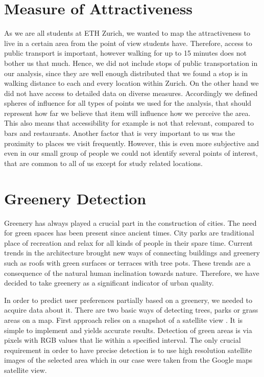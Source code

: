 \documentclass[letterpaper]{article}
\begin{document}
\section{Measure of Attractiveness}\label{sec:attractiveness}
As we are all students at ETH Zurich, we wanted to map the attractiveness to live in a certain area from the point of view students have.
Therefore, access to public transport is important, however walking for up to 15 minutes does not bother us that much. Hence, we did not
include stops of public transportation in our analysis, since they are well enough distributed that we found a stop is in walking distance
to each and every location within Zurich.
On the other hand we did not have access to detailed data on diverse measures. Accordingly we defined spheres of influence for all types
of points we used for the analysis, that should represent how far we believe that item will influence how we perceive the area.
This also means that accessibility for example is not that relevant, compared to bars and restaurants. Another factor that is
very important to us was the proximity to places we visit frequently. However, this is even more subjective and even in our
small group of people we could not identify several points of interest, that are common to all of us except for study related locations.

\section{Greenery Detection}\label{sec:greenery}
\indent Greenery has always played a crucial part in the construction of cities. The need for green spaces has been present since ancient times.
City parks are traditional place of recreation and relax for all kinds of people in their spare time. Current trends in the architecture brought new ways of
connecting buildings and greenery such as roofs with green surfaces or terraces with tree pots. These trends are a consequence of the natural
human inclination towards nature. Therefore, we have decided to take greenery as a significant indicator of urban quality.

\indent In order to predict user preferences partially based on a greenery, we needed to acquire data about it. There are two basic ways of detecting trees,
parks or grass areas on a map. First approach relies on a snapshot of a satellite view \cite{smartCities}. It is simple to implement and yields accurate results.
Detection of green areas is via pixels with RGB values that lie within a specified interval. The only crucial requirement in order to have precise detection
is to use high resolution satellite images of the selected area which in our case were taken from the Google maps satellite view.
\end{document}
